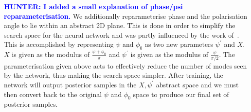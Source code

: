 \documentclass[%
showpacs,
nofootinbib,
 amsmath,amssymb,
 aps,
 twocolumn,
 prl,
 reprint,
floatfix,
]{revtex4-1}
\newcommand{\hunter}[1]{\textbf{\textcolor{blue}{HUNTER: #1}}}
\begin{document}
%
%
\hunter{I added a small explanation of phase/psi reparameterisation.}
We additionally reparameterise phase and the polarisation angle to lie within 
an abstract 2D plane.  This is done in order to simplify the search space for 
the neural network and was partly influenced by the work of~\cite{10.1093/mnras/stv1584}. 
This is accomplished by representing $\psi$ and $\phi_ 0$ as two new parameters 
$\psi^{'}$ and $X$. $X$ is given as the modulus of $\frac{\psi+\phi_0}{\pi}$ and 
$\psi^{'}$ is given as the modulus of $\frac{\psi}{\pi/2}$. The parameterisation given above acts to effectively reduce the number 
of modes seen by the network, thus making the search space simpler. After training, the network 
will output posterior samples in the $X,\psi^{'}$ abstract space  and we 
must then convert back to the original $\psi$ and $\phi_ 0$ space to produce our final 
set of posterior samples. 

%
%


\end{document}
